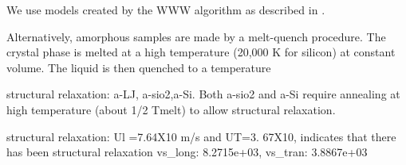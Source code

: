 \documentclass[aps,prb,preprint,superscriptaddress,amsmath,amssymb,floatfix]{revtex4}
\begin{document}
We use models created by the WWW algorithm as described in \cite{normand}. 

Alternatively, amorphous samples are made by a melt-quench procedure.  
The crystal phase is melted at a high temperature (20,000 K for silicon) 
at constant volume.  The liquid is then quenched to a temperature

structural relaxation: a-LJ, a-sio2,a-Si.  Both a-sio2 and a-Si require 
annealing at high temperature (about 1/2 Tmelt) to allow structural 
relaxation. 

structural relaxation:  Ul =7.64X10 m/s and UT=3. 67X10, indicates that 
there has been structural relaxation 
vs_long: 8.2715e+03, vs_tran: 3.8867e+03


% 
% 
% 
% 
\end{document}
